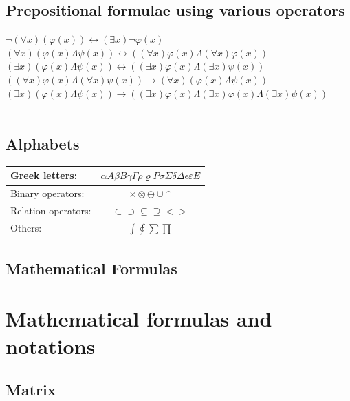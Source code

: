 \documentclass{article}
\begin{document}
\subsection{Prepositional formulae using various operators}
$\neg(\forall x)(\varphi(x)) \longleftrightarrow (\exists x)\neg\varphi(x)$ \\
$(\forall x)(\varphi(x)\Lambda\psi(x)) \longleftrightarrow ((\forall x)\varphi(x)\Lambda(\forall x)\varphi(x))$ \\
$(\exists x)(\varphi(x)\Lambda\psi(x)) \longleftrightarrow ((\exists x)\varphi(x)\Lambda(\exists x)\psi(x))$\\
$((\forall x)\varphi(x)\Lambda(\forall x)\psi(x)) \longrightarrow (\forall x)(\varphi(x)\Lambda\psi(x))$\\
$(\exists x)(\varphi(x)\Lambda\psi(x)) \longrightarrow  ((\exists x)\varphi(x)\Lambda(\exists x)\varphi(x)\Lambda(\exists x)\psi(x))$\\
\\


\subsection{Alphabets}

\begin{table}[H]
\centering
\begin{tabular} {| l | c |}
\hline
Greek letters: &
$\alpha  A  \beta  B \gamma \Gamma \rho \varrho P  \sigma \Sigma  \delta \Delta \epsilon  \varepsilon  E $\\
\hline
Binary operators: &
$\times \otimes \oplus \cup \cap$ \\
\hline
Relation operators:&
$\subset \supset \subseteq \supseteq < >  $\\
\hline
Others:&
$\int \oint \sum \prod$\\
\hline
\end{tabular}
\end{table}

\subsection{Mathematical Formulas}

\section{Mathematical formulas and notations}
\subsection{Matrix}
\end{document}
